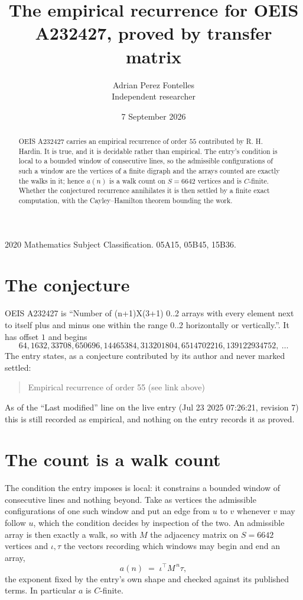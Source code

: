 \documentclass[11pt,a4paper]{article}
\title{The empirical recurrence for OEIS A232427, proved by transfer matrix}
\author{Adrian Perez Fontelles\\ \small Independent researcher}
\date{7 September 2026}
\theoremstyle{plain}
\theoremstyle{definition}
\begin{document}
\maketitle

\begin{abstract}
OEIS A232427 carries an empirical recurrence of order $55$ contributed by R. H. Hardin. It is
true, and it is decidable rather than empirical. The entry's condition is local to a bounded window of consecutive lines, so
the admissible configurations of such a window are the vertices of a finite digraph and the
arrays counted are exactly the walks in it; hence $a(n)$ is a walk count on $S=6642$ vertices
and is $C$-finite. Whether the conjectured recurrence annihilates it is then settled by a
finite exact computation, with the Cayley--Hamilton theorem bounding the work.
\end{abstract}

\noindent\small 2020 Mathematics Subject Classification. 05A15, 05B45, 15B36.\normalsize

\section{The conjecture}

OEIS A232427 is ``Number of (n+1)X(3+1) 0..2 arrays with every element next to itself plus and minus one within the range 0..2 horizontally or vertically.''. It has offset $1$ and begins
\[
64, 1632, 33708, 650696, 14465384, 313201804, 6514702216, 139122934752,\ \dots
\]
The entry states, as a conjecture contributed by its author and never marked settled:
\begin{quote}
Empirical recurrence of order 55 (see link above)
\end{quote}
As of the ``Last modified'' line on the live entry (Jul 23 2025 07:26:21, revision 7) this is still
recorded as empirical, and nothing on the entry records it as proved.

\section{The count is a walk count}

The condition the entry imposes is local: it constrains a bounded window of consecutive lines and nothing beyond. Take as
vertices the admissible configurations of one such window and put an edge from $u$ to $v$
whenever $v$ may follow $u$, which the condition decides by inspection of the two. An
admissible array is then exactly a walk, so with $M$ the adjacency matrix on $S=6642$ vertices
and $\iota,\tau$ the vectors recording which windows may begin and end an array,
\[
a(n)\;=\;\iota^{\!\top}M^{\,n}\tau ,
\]
the exponent fixed by the entry's own shape and checked against its published terms. In
particular $a$ is $C$-finite.
\end{document}

